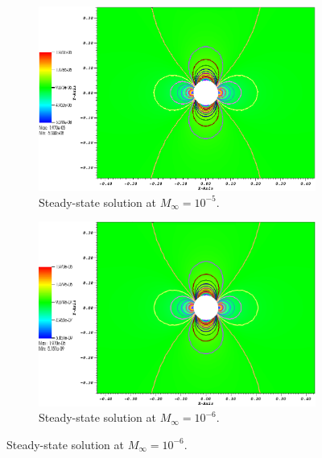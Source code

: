 \documentclass[preprint,10pt]{elsarticle}
\begin{document}
\begin{figure}[H]
        \begin{subfigure}[b]{0.495\textwidth}
                \centering
                \includegraphics[width=\textwidth]{CylinderMach1em5ZoomIn.png}
                \caption{Steady-state solution at $M_\infty=10^{-5}$.}
                \label{fig:cyl_1em5}
        \end{subfigure}
        \begin{subfigure}[b]{0.495\textwidth}
                \centering
                \includegraphics[width=\textwidth]{CylinderMach1em6ZoomIn.png}
                \caption{Steady-state solution at $M_\infty=10^{-6}$.}
                \label{fig:cyl_1em6}

\end{subfigure}
\end{figure}
\end{document}
